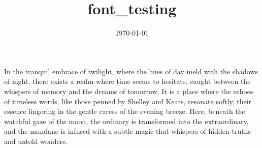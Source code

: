\documentclass[30pt]{article}
\title{font_testing}
\date{\today}
\begin{document}
\Large  In the tranquil embrace of twilight, where the hues of day meld with the shadows of night, there exists a realm where time seems to hesitate, caught between the whispers of memory and the dreams of tomorrow. It is a place where the echoes of timeless words, like those penned by Shelley and Keats, resonate softly, their essence lingering in the gentle caress of the evening breeze. Here, beneath the watchful gaze of the moon, the ordinary is transformed into the extraordinary, and the mundane is infused with a subtle magic that whispers of hidden truths and untold wonders. 
\end{document}
